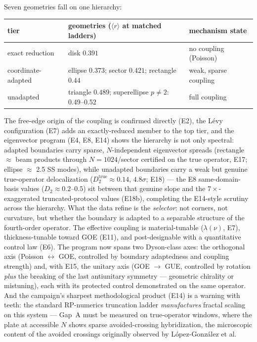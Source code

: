 \documentclass[11pt]{article}
\newcommand{\rmean}{\langle r \rangle}
\begin{document}
Seven geometries fall on one hierarchy:
\begin{center}
\begin{tabular}{lll}
\toprule
tier & geometries ($\rmean$ at matched ladders) & mechanism state\\
\midrule
exact reduction & disk $0.391$ & no coupling (Poisson)\\
coordinate-adapted & ellipse $0.373$; sector $0.421$; rectangle $0.44$ &
weak, sparse coupling\\
unadapted & triangle $0.489$; superellipse $p\neq2$: $0.49$--$0.52$ &
full coupling\\
\bottomrule
\end{tabular}
\end{center}
The free-edge origin of the coupling is confirmed directly (E2), the
L\'evy configuration (E7) adds an exactly-reduced member to the top tier,
and the eigenvector program (E4, E8, E14) shows the hierarchy is not only
spectral: adapted boundaries carry sparse, $N$-independent eigenvector
spreads (rectangle $\approx$ beam products through $N=1024$/sector
certified on the true operator, E17; ellipse $\approx$ 2.5 SS modes),
while unadapted boundaries
carry a weak but genuine true-operator delocalization
($D_2^{\mathrm{true}}\approx0.14$, $4.8\sigma$; E18) --- the E8
same-domain-basis values ($D_2\approx0.2$--$0.5$) sit between that
genuine slope and the $7\times$-exaggerated truncated-protocol values
(E18b), completing the E14-style scrutiny across the hierarchy. What the data
refine is the \emph{selector}: not corners, not curvature, but whether the
boundary is adapted to a separable structure of the fourth-order operator.
The effective coupling is material-tunable ($\lambda(\nu)$, E7),
thickness-tunable toward GOE (E11), and post-designable with a quantitative
control law (E6). The program now spans two Dyson-class axes: the
orthogonal axis (Poisson $\leftrightarrow$ GOE, controlled by boundary
adaptedness and coupling strength) and, with E15, the unitary axis
(GOE $\to$ GUE, controlled by rotation \emph{plus} the breaking of the last
antiunitary symmetry --- geometric chirality or mistuning), each with its
protected control demonstrated on the same operator. And the campaign's sharpest methodological product (E14)
is a warning with teeth: the standard RP-numerics truncation ladder
\emph{manufactures} fractal scaling on this system --- Gap~A must be
measured on true-operator windows, where the plate at accessible $N$ shows
sparse avoided-crossing hybridization, the microscopic content of the
avoided crossings originally observed by L\'opez-Gonz\'alez et al.
\end{document}

